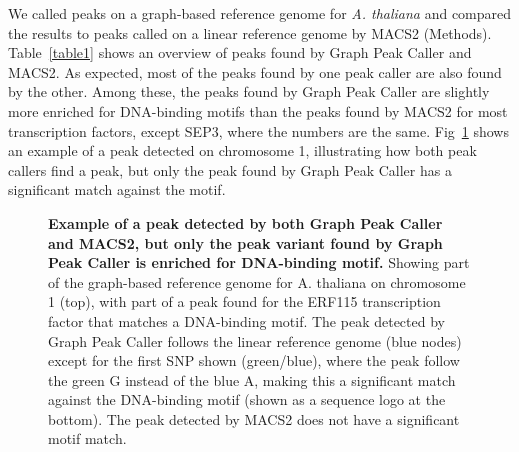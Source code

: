 \documentclass[10pt,letterpaper]{article}
\begin{document}
We called peaks on a graph-based reference genome for \emph{A. thaliana} and compared the results to peaks called on a linear reference genome by MACS2 (Methods). Table~\ref{table1} shows an overview of peaks found by Graph Peak Caller and MACS2. As expected, most of the peaks found by one peak caller are also found by the other. Among these, the peaks found by Graph Peak Caller are slightly more enriched for DNA-binding motifs than the peaks found by MACS2 for most transcription factors, except SEP3, where the numbers are the same. Fig~\ref{motif_enrichment} shows an example of a peak detected on chromosome 1, illustrating how both peak callers find a peak, but only the peak found by Graph Peak Caller has a significant match against the motif.
\begin{figure}
 \caption{{\bf Example of a peak detected by both Graph Peak Caller and MACS2, but only the peak variant found by Graph Peak Caller is enriched for DNA-binding motif.} Showing part of the graph-based reference genome for A. thaliana on chromosome 1 (top), with part of a peak found for the ERF115 transcription factor that matches a DNA-binding motif. The peak detected by Graph Peak Caller follows the linear reference genome (blue nodes) except for the first SNP shown (green/blue), where the peak follow the green G instead of the blue A, making this a significant match against the DNA-binding motif (shown as a sequence logo at the bottom). The peak detected by MACS2 does not have a significant motif match.}
\label{motif_enrichment}
\end{figure}
\end{document}
